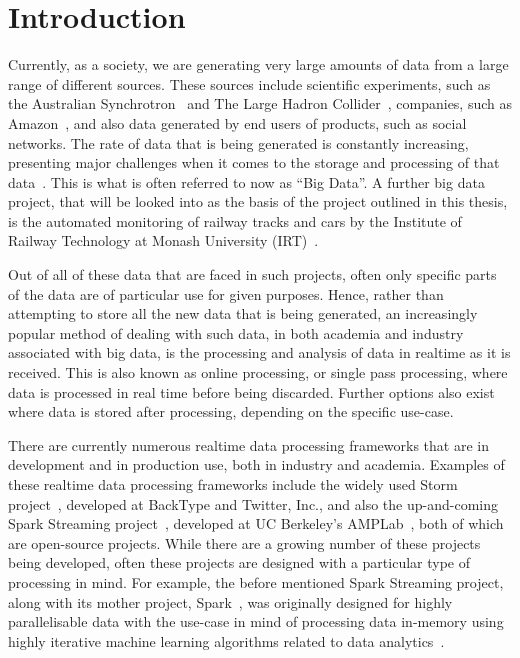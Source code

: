 \chapter{Introduction}
\label{sec:intro}

Currently, as a society, we are generating very large amounts of data from a large range of different sources. These
sources include scientific experiments, such as the Australian Synchrotron~\cite{web:synchrotron} and The Large Hadron
Collider~\cite{web:LHC}, companies, such as Amazon~\cite{web:Amazon}, and also data generated by end users of products,
such as social networks. The rate of data that is being generated is constantly increasing, presenting major challenges
when it comes to the storage and processing of that data~\cite{bohlouli_towards_2013}. This is what is often referred to
now as ``Big Data''. A further big data project, that will be looked into as the basis of the project outlined in this
thesis, is the automated monitoring of railway tracks and cars by the Institute of Railway Technology at Monash University
(IRT)~\cite{web:monash_irt}.

Out of all of these data that are faced in such projects, often only specific parts of the data are of particular use for given
purposes. Hence, rather than attempting to store all the new data that is being generated, an increasingly popular method of
dealing with such data, in both academia and industry associated with big data, is the processing and analysis of
data in realtime as it is received. This is also known as online processing, or single pass processing, where data is
processed in real time before being discarded. Further options also exist where data is stored after processing, depending
on the specific use-case.

There are currently numerous realtime data processing frameworks that are in development and in production use, both in
industry and academia. Examples of these realtime data processing frameworks include the widely used Storm
project~\cite{web:Storm}, developed at BackType and Twitter, Inc., and also the up-and-coming Spark Streaming
project~\cite{web:SparkStreaming}, developed at UC Berkeley's AMPLab~\cite{web:UCBerkelyAMCLab}, both of which are
open-source projects. While there are a growing number of these projects being developed, often these projects are designed
with a particular type of processing in mind. For example, the before
mentioned Spark Streaming project, along with its mother project, Spark~\cite{web:Spark}, was originally designed for highly
parallelisable data with the use-case in mind of processing data in-memory using highly iterative machine learning
algorithms related to data analytics~\cite{liu_survey_2014}.

